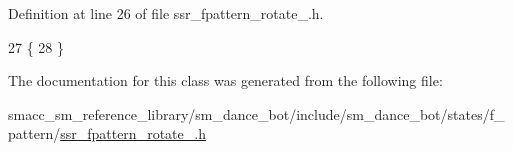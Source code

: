 Definition at line 26 of file ssr\+\_\+fpattern\+\_\+rotate\+\_.\+h.


\begin{DoxyCode}
27   \{
28   \}
\end{DoxyCode}


The documentation for this class was generated from the following file\+:\begin{DoxyCompactItemize}
\item 
smacc\+\_\+sm\+\_\+reference\+\_\+library/sm\+\_\+dance\+\_\+bot/include/sm\+\_\+dance\+\_\+bot/states/f\+\_\+pattern/\hyperlink{ssr__fpattern__rotate__2_8h}{ssr\+\_\+fpattern\+\_\+rotate\+\_.\+h}\end{DoxyCompactItemize}
